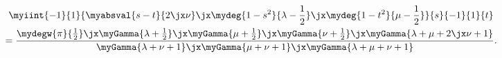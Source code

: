 	\begin{multline}  
        \myiint{-1}{1}{\myabsval{s-t}{2\jx\nu}\jx
        \mydeg{1-s^2}{\lambda-\frac{1}{2}}\jx
        \mydeg{1-t^2}{\mu-\frac{1}{2}}}{s}{-1}{1}{t}
	  \\=
      \frac{\mydegw{\pi}{\frac{1}{2}}
      \jx\myGamma{\lambda + \frac{1}{2}}
      \jx\myGamma{\mu+\frac{1}{2}}
      \jx\myGamma{\nu+\frac{1}{2}}
      \jx\myGamma{\lambda+\mu+2\jx\nu+1}}
      {\myGamma{\lambda+\nu+1}\jx\myGamma{\mu+\nu+1}\jx\myGamma{\lambda+\mu+\nu+1}}
      .
\label{eqn:lm0}
	\end{multline}
